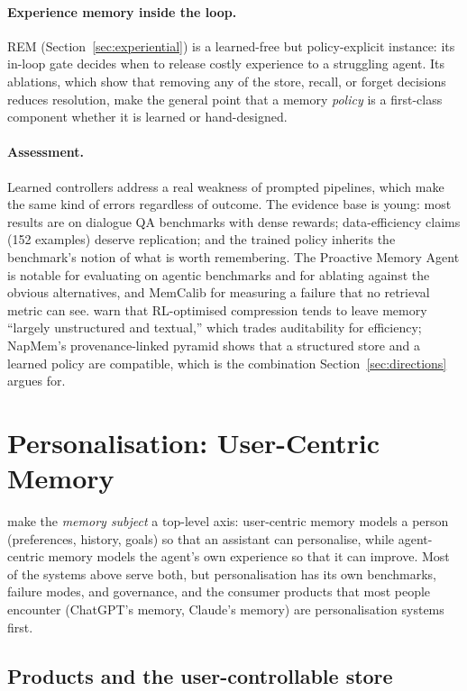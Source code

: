 \documentclass[11pt]{article}
\begin{document}
\paragraph{Experience memory inside the loop.} REM (Section~\ref{sec:experiential}) is a learned-free but policy-explicit instance: its in-loop gate decides when to release costly experience to a struggling agent. Its ablations, which show that removing any of the store, recall, or forget decisions reduces resolution, make the general point that a memory \emph{policy} is a first-class component whether it is learned or hand-designed.

\paragraph{Assessment.} Learned controllers address a real weakness of prompted pipelines, which make the same kind of errors regardless of outcome. The evidence base is young: most results are on dialogue QA benchmarks with dense rewards; data-efficiency claims (152 examples) deserve replication; and the trained policy inherits the benchmark's notion of what is worth remembering. The Proactive Memory Agent is notable for evaluating on agentic benchmarks and for ablating against the obvious alternatives, and MemCalib for measuring a failure that no retrieval metric can see. \citet{jiang2026anatomy} warn that RL-optimised compression tends to leave memory ``largely unstructured and textual,'' which trades auditability for efficiency; NapMem's provenance-linked pyramid shows that a structured store and a learned policy are compatible, which is the combination Section~\ref{sec:directions} argues for.

\section{Personalisation: User-Centric Memory}
\label{sec:personalization}

\citet{huang2026secondhalf} make the \emph{memory subject} a top-level axis: user-centric memory models a person (preferences, history, goals) so that an assistant can personalise, while agent-centric memory models the agent's own experience so that it can improve. Most of the systems above serve both, but personalisation has its own benchmarks, failure modes, and governance, and the consumer products that most people encounter (ChatGPT's memory, Claude's memory) are personalisation systems first.

\subsection{Products and the user-controllable store}
\end{document}
